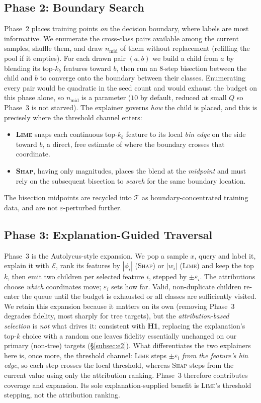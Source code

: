 \documentclass[sigconf,anonymous,review]{acmart}
\begin{document}
\subsection{Phase 2: Boundary Search}
\label{subsec:boundary}
Phase~2 places training points \emph{on} the decision boundary, where labels are most
informative. We enumerate the cross-class pairs available among the current samples, shuffle them,
and draw $n_{\text{mid}}$ of them without replacement (refilling the pool if it empties). For each
drawn pair $(a,b)$ we build a child from $a$ by blending its top-$k_b$ features toward $b$, then run
an $8$-step bisection between the child and $b$ to converge onto the boundary between their classes.
Enumerating every pair would be quadratic in the seed count and would exhaust the budget on this
phase alone, so $n_{\text{mid}}$ is a parameter ($10$ by default, reduced at small $Q$ so Phase~3 is
not starved). The explainer governs \emph{how} the
child is placed, and this is precisely where the threshold channel enters:
\begin{itemize}
  \item \textbf{\textsc{Lime}} snaps each continuous top-$k_b$ feature to its local
  \emph{bin edge} on the side toward $b$, a direct, free estimate of where the boundary
  crosses that coordinate.
  \item \textbf{\textsc{Shap}}, having only magnitudes, places the blend at the
  \emph{midpoint} and must rely on the subsequent bisection to \emph{search} for the
  same boundary location.
\end{itemize}
The bisection midpoints are recycled into $\mathcal{T}$ as boundary-concentrated training data,
and are not $\varepsilon$-perturbed further.

\subsection{Phase 3: Explanation-Guided Traversal}
\label{subsec:traversal}
Phase~3 is the Autolycus-style expansion. We pop a sample $x$, query and label it,
explain it with $\mathcal{E}$, rank its features by $|\phi_i|$ (\textsc{Shap}) or $|w_i|$
(\textsc{Lime}) and keep the top $k$, then emit two children per selected feature $i$, stepped by
$\pm\varepsilon_i$. The attributions choose \emph{which} coordinates move; $\varepsilon_i$ sets how far. Valid, non-duplicate children re-enter the queue until the budget is
exhausted or all classes are sufficiently visited. We retain this expansion because it matters on its own (removing Phase~3 degrades fidelity, most sharply for tree targets), but the \emph{attribution-based selection} is \emph{not} what drives it:
consistent with \textbf{H1}, replacing the explanation's top-$k$ choice with a random one
leaves fidelity essentially unchanged on our primary (non-tree) targets
(\S\ref{subsec:e2}). What differentiates the two explainers here is, once more, the
threshold channel: \textsc{Lime} steps $\pm\varepsilon_i$ \emph{from the feature's bin edge}, so each step crosses the local threshold, whereas \textsc{Shap} steps from the
current value using only the attribution ranking. Phase~3 therefore contributes
coverage and expansion. Its sole explanation-supplied benefit is \textsc{Lime}'s
threshold stepping, not the attribution ranking.
\end{document}
